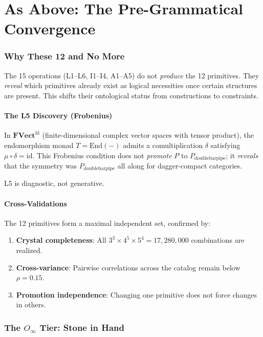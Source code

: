 \documentclass[12pt,a4paper]{article}
\newcommand{\Ppms}{P_{\text{doublebarpipe}}}
\begin{document}
\part{As Above: The Pre-Grammatical Convergence}

\section{Why These 12 and No More}

The 15 operations (L1--L6, I1--I4, A1--A5) do not \emph{produce} the 12 primitives. They \emph{reveal} which primitives already exist as logical necessities once certain structures are present. This shifts their ontological status from constructions to constraints.

\subsection{The L5 Discovery (Frobenius)}

In $\mathbf{FVect}^{\mathrm{fd}}$ (finite-dimensional complex vector spaces with tensor product), the endomorphism monad $T = \mathrm{End}(-)$ admits a comultiplication $\delta$ satisfying $\mu \circ \delta = \mathrm{id}$. This Frobenius condition does not \emph{promote} $P$ to $\Ppms$; it \emph{reveals} that the symmetry was $\Ppms$ all along for dagger-compact categories.

L5 is diagnostic, not generative.

\subsection{Cross-Validations}

The 12 primitives form a maximal independent set, confirmed by:

\begin{enumerate}[label=\arabic*.]
    \item \textbf{Crystal completeness}: All $3^3 \times 4^5 \times 5^4 = 17{,}280{,}000$ combinations are realized.
    \item \textbf{Cross-variance}: Pairwise correlations across the catalog remain below $\rho = 0.15$.
    \item \textbf{Promotion independence}: Changing one primitive does not force changes in others.
\end{enumerate}

\section{The $O_{\infty}$ Tier: Stone in Hand}
\end{document}
